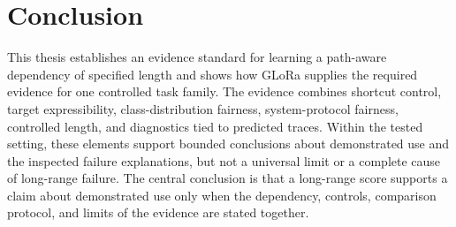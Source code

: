 \section{Conclusion}

This thesis establishes an evidence standard for learning a path-aware dependency of specified length and shows how GLoRa supplies the required evidence for one controlled task family.
The evidence combines shortcut control, target expressibility, class-distribution fairness, system-protocol fairness, controlled length, and diagnostics tied to predicted traces.
Within the tested setting, these elements support bounded conclusions about demonstrated use and the inspected failure explanations, but not a universal limit or a complete cause of long-range failure.
The central conclusion is that a long-range score supports a claim about demonstrated use only when the dependency, controls, comparison protocol, and limits of the evidence are stated together.
